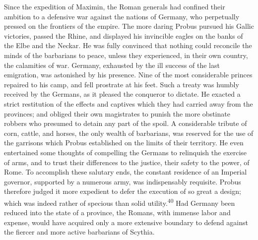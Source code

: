 Since the expedition of Maximin, the Roman generals had confined
their ambition to a defensive war against the nations of Germany,
who perpetually pressed on the frontiers of the empire. The more
daring Probus pursued his Gallic victories, passed the Rhine, and
displayed his invincible eagles on the banks of the Elbe and the
Neckar. He was fully convinced that nothing could reconcile the
minds of the barbarians to peace, unless they experienced, in
their own country, the calamities of war. Germany, exhausted by
the ill success of the last emigration, was astonished by his
presence. Nine of the most considerable princes repaired to his
camp, and fell prostrate at his feet. Such a treaty was humbly
received by the Germans, as it pleased the conqueror to dictate.
He exacted a strict restitution of the effects and captives which
they had carried away from the provinces; and obliged their own
magistrates to punish the more obstinate robbers who presumed to
detain any part of the spoil. A considerable tribute of corn,
cattle, and horses, the only wealth of barbarians, was reserved
for the use of the garrisons which Probus established on the
limits of their territory. He even entertained some thoughts of
compelling the Germans to relinquish the exercise of arms, and to
trust their differences to the justice, their safety to the
power, of Rome. To accomplish these salutary ends, the constant
residence of an Imperial governor, supported by a numerous army,
was indispensably requisite. Probus therefore judged it more
expedient to defer the execution of so great a design; which was
indeed rather of specious than solid utility.\textsuperscript{40} Had Germany been
reduced into the state of a province, the Romans, with immense
labor and expense, would have acquired only a more extensive
boundary to defend against the fiercer and more active barbarians
of Scythia.


